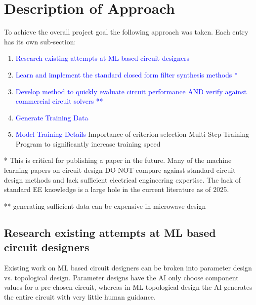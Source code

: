 \documentclass[10pt,conference]{IEEEtran}
\begin{document}
\section{Description of Approach}

To achieve the overall project goal the following approach was taken. Each entry has its own sub-section:
\begin{enumerate}[label=\arabic*)]
    \item \textcolor{blue}{Research existing attempts at ML based circuit designers}
    \item \textcolor{blue}{Learn and implement the standard closed form filter synthesis methods *}
    \item \textcolor{blue}{Develop method to quickly evaluate circuit performance AND verify against commercial circuit solvers **}
    \item \textcolor{blue}{Generate Training Data}
    \item \textcolor{blue}{Model Training Details}
    	\subitem Importance of criterion selection
		\subitem Multi-Step Training Program to significantly increase training speed
\end{enumerate}

* This is critical for publishing a paper in the future. Many of the machine learning papers on circuit design DO NOT compare against standard circuit design methods and lack sufficient electrical engineering expertise. The lack of standard EE knowledge is a large hole in the current literature as of 2025.

** generating sufficient data can be expensive in microwave design


\subsection{Research existing attempts at ML based circuit designers}

Existing work on ML based circuit designers can be broken into parameter design vs. topological design. Parameter designs have the AI only choose component values for a pre-chosen circuit, whereas in ML topological design the AI generates the entire circuit with very little human guidance.
\end{document}
